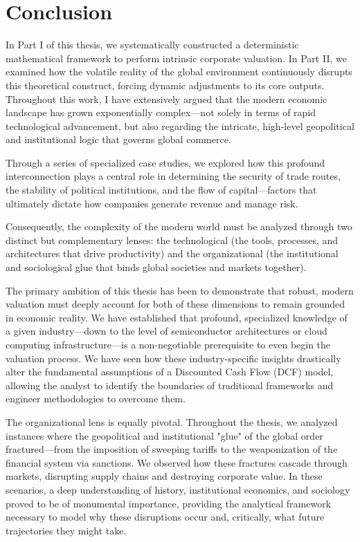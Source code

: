 \cleardoublepage
{}
{}
\chapter*{Conclusion}

In Part I of this thesis, we systematically constructed a deterministic mathematical framework to perform intrinsic corporate valuation. In Part II, we examined how the volatile reality of the global environment continuously disrupts this theoretical construct, forcing dynamic adjustments to its core outputs. Throughout this work, I have extensively argued that the modern economic landscape has grown exponentially complex—not solely in terms of rapid technological advancement, but also regarding the intricate, high-level geopolitical and institutional logic that governs global commerce.

Through a series of specialized case studies, we explored how this profound interconnection plays a central role in determining the security of trade routes, the stability of political institutions, and the flow of capital—factors that ultimately dictate how companies generate revenue and manage risk.

Consequently, the complexity of the modern world must be analyzed through two distinct but complementary lenses: the technological (the tools, processes, and architectures that drive productivity) and the organizational (the institutional and sociological glue that binds global societies and markets together).

The primary ambition of this thesis has been to demonstrate that robust, modern valuation must deeply account for both of these dimensions to remain grounded in economic reality. We have established that profound, specialized knowledge of a given industry—down to the level of semiconductor architectures or cloud computing infrastructure—is a non-negotiable prerequisite to even begin the valuation process. We have seen how these industry-specific insights drastically alter the fundamental assumptions of a Discounted Cash Flow (DCF) model, allowing the analyst to identify the boundaries of traditional frameworks and engineer methodologies to overcome them.

The organizational lens is equally pivotal. Throughout the thesis, we analyzed instances where the geopolitical and institutional "glue" of the global order fractured—from the imposition of sweeping tariffs to the weaponization of the financial system via sanctions. We observed how these fractures cascade through markets, disrupting supply chains and destroying corporate value. In these scenarios, a deep understanding of history, institutional economics, and sociology proved to be of monumental importance, providing the analytical framework necessary to model why these disruptions occur and, critically, what future trajectories they might take.

